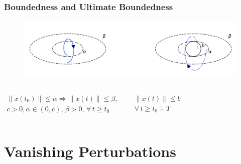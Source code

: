 \documentclass[student, noshadow, lsr, english, aspectratio=169, t]{ITR_LSR_slides}
\begin{document}
\begin{frame}
	\frametitle{Boundedness and Ultimate Boundedness}
	\begin{figure}
		\centering
		\includegraphics[width=\textwidth]{ultimate_boundedness_rotated.pdf}
		\caption{}
		\label{fig:boundedness_vs_ultimate_boundedness}
	\end{figure}
	\vspace{-2cm}
	\begin{columns}[t,totalwidth=\textwidth]
		\begin{tcolorbox}[title=Boundedness:]
			\vspace{-0.4cm}
			\begin{align*}
				\|\underline{x}(t_0)\| \leq \alpha \Rightarrow \|\underline{x}(t)\| \leq \beta,
				\\ c>0, \alpha\in(0,c),\, \beta>0,\,\forall\, t \geq t_0
			\end{align*}		
		\end{tcolorbox}
		
		\begin{tcolorbox}[title=Ultimate Boundedness:]
			\vspace{-0.4cm}
			\begin{align*}
				\|\underline{x}(t)\| \leq b 
				\\ \forall\, t \geq t_0+T
			\end{align*}
		\end{tcolorbox}
    \end{columns}
\end{frame}


\section{Vanishing Perturbations}
\end{document}
